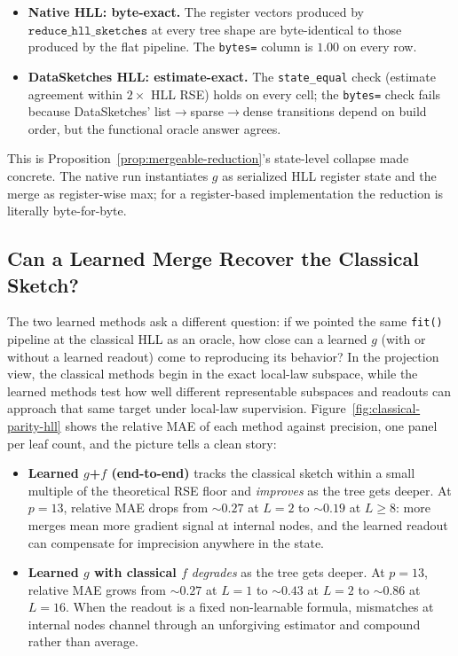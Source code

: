 \begin{itemize}[leftmargin=1.5em]
    \item \textbf{Native HLL: byte-exact.} The register vectors produced
          by $\texttt{reduce\_hll\_sketches}$ at every tree shape are
          byte-identical to those produced by the flat pipeline. The
          \texttt{bytes=} column is $1.00$ on every row.
    \item \textbf{DataSketches HLL: estimate-exact.} The \texttt{state\_equal}
          check (estimate agreement within $2\times$ HLL RSE) holds on
          every cell; the \texttt{bytes=} check fails because
          DataSketches' list$\to$sparse$\to$dense transitions depend on
          build order, but the functional oracle answer agrees.
\end{itemize}

This is Proposition~\ref{prop:mergeable-reduction}'s state-level collapse
made concrete. The native run instantiates $g$ as serialized HLL register
state and the merge as register-wise max; for a register-based implementation
the reduction is literally byte-for-byte.

\subsection{Can a Learned Merge Recover the Classical Sketch?}

The two learned methods ask a different question: if we pointed the same
\texttt{fit()} pipeline at the classical HLL as an oracle, how close can
a learned $g$ (with or without a learned readout) come to
reproducing its behavior? In the projection view, the classical methods
begin in the exact local-law subspace, while the learned methods test how
well different representable subspaces and readouts can approach that same
target under local-law supervision. Figure~\ref{fig:classical-parity-hll} shows
the relative MAE of each method against precision, one panel per leaf
count, and the picture tells a clean story:

\begin{itemize}[leftmargin=1.5em]
    \item \textbf{Learned $g$+$f$ (end-to-end)} tracks the classical
          sketch within a small multiple of the theoretical RSE floor and
          \emph{improves} as the tree gets deeper. At $p=13$, relative
          MAE drops from $\sim\!0.27$ at $L=2$ to $\sim\!0.19$ at
          $L \ge 8$: more merges mean more gradient signal at internal
          nodes, and the learned readout can compensate for imprecision
          anywhere in the state.
    \item \textbf{Learned $g$ with classical $f$} \emph{degrades} as the
          tree gets deeper. At $p=13$, relative MAE grows from $\sim\!0.27$
          at $L=1$ to $\sim\!0.43$ at $L=2$ to $\sim\!0.86$ at $L=16$.
          When the readout is a fixed non-learnable formula, mismatches
          at internal nodes channel through an unforgiving estimator and
          compound rather than average.
\end{itemize}

